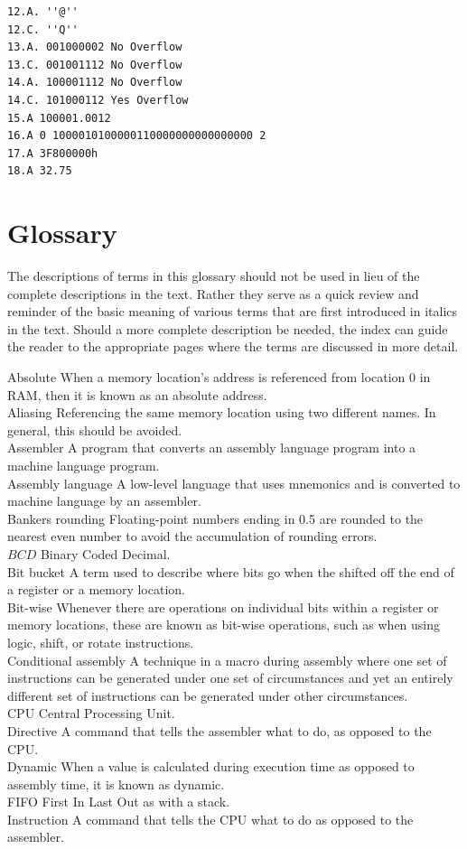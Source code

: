 \documentclass[10pt]{book}
\begin{document}
\begin{verbatim}
12.A. ''@''
12.C. ''Q''
13.A. 001000002 No Overflow
13.C. 001001112 No Overflow
14.A. 100001112 No Overflow
14.C. 101000112 Yes Overflow
15.A 100001.0012
16.A 0 1000010100000110000000000000000 2
17.A 3F800000h
18.A 32.75
\end{verbatim}

\section{Glossary}
The descriptions of terms in this glossary should not be used in lieu of the complete descriptions in the text. Rather they serve as a quick review and reminder of the basic meaning of various terms that are first introduced in italics in the text. Should a more complete description be needed, the index can guide the reader to the appropriate pages where the terms are discussed in more detail.


Absolute When a memory location's address is referenced from location 0 in RAM, then it is known as an absolute address.\\
Aliasing Referencing the same memory location using two different names. In general, this should be avoided.\\
Assembler A program that converts an assembly language program into a machine language program.\\
Assembly language A low-level language that uses mnemonics and is converted to machine language by an assembler.\\
Bankers rounding Floating-point numbers ending in 0.5 are rounded to the nearest even number to avoid the accumulation of rounding errors.\\
$B C D$ Binary Coded Decimal.\\
Bit bucket A term used to describe where bits go when the shifted off the end of a register or a memory location.\\
Bit-wise Whenever there are operations on individual bits within a register or memory locations, these are known as bit-wise operations, such as when using logic, shift, or rotate instructions.\\
Conditional assembly A technique in a macro during assembly where one set of instructions can be generated under one set of circumstances and yet an entirely different set of instructions can be generated under other circumstances.\\
CPU Central Processing Unit.\\
Directive A command that tells the assembler what to do, as opposed to the CPU.\\
Dynamic When a value is calculated during execution time as opposed to assembly time, it is known as dynamic.\\
FIFO First In Last Out as with a stack.\\
Instruction A command that tells the CPU what to do as opposed to the assembler.
\end{document}
